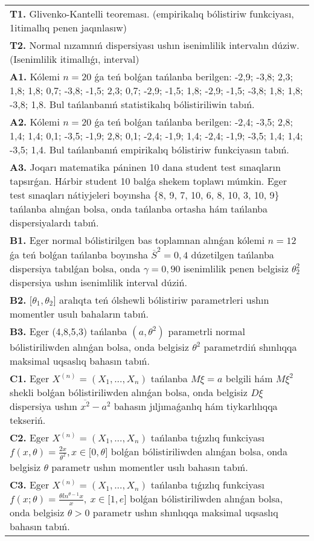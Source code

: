 \documentclass{article}
\begin{document}
\begin{tabular}{m{17cm}}
\textbf{T1.} 
Glivenko-Kantelli teoreması. (empirikalıq bólistiriw funkciyası, 1itimallıq penen jaqınlasıw)
 \\
\textbf{T2.} 
Normal nızamnıń dispersiyası ushın isenimlilik intervalın dúziw. (Isenimlilik itimallıǵı, interval)
 \\
\textbf{A1.} 
Kólemi \(n = 20\) ǵa teń bolǵan tańlanba berilgen: -2,9; -3,8; 2,3; 1,8; 1,8; 0,7; -3,8; -1,5; 2,3; 0,7; -2,9; -1,5; 1,8; -2,9; -1,5; -3,8; 1,8; 1,8; -3,8; 1,8. Bul tańlanbanıń statistikalıq bólistiriliwin tabıń.
 \\
\textbf{A2.} 
Kólemi \(n = 20\) ǵa teń bolǵan tańlanba berilgen: -2,4; -3,5; 2,8; 1,4; 1,4; 0,1; -3,5; -1,9; 2,8; 0,1; -2,4; -1,9; 1,4; -2,4; -1,9; -3,5; 1,4; 1,4; -3,5; 1,4. Bul tańlanbanıń empirikalıq bólistiriw funkciyasın tabıń.
 \\
\textbf{A3.} 
Joqarı matematika páninen 10 dana student test sınaqların tapsırǵan. Hárbir student 10 balǵa shekem toplawı múmkin. Eger test sınaqları nátiyjeleri boyınsha \{8, 9, 7, 10, 6, 8, 10, 3, 10, 9\} tańlanba alınǵan bolsa, onda tańlanba ortasha hám tańlanba dispersiyalardı tabıń.
 \\
\textbf{B1.} 
Eger normal bólistirilgen bas toplamnan alınǵan kólemi \(n = 12\) ǵa teń bolǵan tańlanba boyınsha \({\overline{S}}^{2} = 0,4\) dúzetilgen tańlanba dispersiya tabılǵan bolsa, onda \(\gamma = 0,90\) isenimlilik penen belgisiz \(\theta_{2}^{2}\) dispersiya ushın isenimlilik interval dúziń.
 \\
\textbf{B2.} 
\(\lbrack\theta_{1},\theta_{2}\rbrack\) aralıqta teń ólshewli bólistiriw parametrleri ushın momentler usulı bahaların tabıń.
 \\
\textbf{B3.} 
Eger (4,8,5,3) tańlanba \(\left( a,\theta^{2} \right)\) parametrli normal bólistiriliwden alınǵan bolsa, onda belgisiz \(\theta^{2}\) parametrdiń shınlıqqa maksimal uqsaslıq bahasın tabıń.
 \\
\textbf{C1.} 
Eger \(X^{(n)} = \left( X_{1},...,X_{n} \right)\) tańlanba \(M\xi = a\) belgili hám \(M\xi^{2}\) shekli bolǵan bólistiriliwden alınǵan bolsa, onda belgisiz \(D\xi\) dispersiya ushın \(\overline{x^{2}} - a^{2}\) bahasın jıljımaǵanlıq hám tiykarlılıqqa tekseriń.
 \\
\textbf{C2.} 
Eger \(X^{(n)} = \left( X_{1},...,X_{n} \right)\) tańlanba tıǵızlıq funkciyası
$f(x,\theta) = \frac{2x}{\theta^{2}},x \in \lbrack 0,\theta\rbrack$
bolǵan bólistiriliwden alınǵan bolsa, onda belgisiz \(\theta\) parametr ushın momentler usılı bahasın tabıń.
 \\
\textbf{C3.} 
Eger \(X^{(n)} = \left( X_{1},...,X_{n} \right)\) tańlanba tıǵızlıq funkciyası
$f(x;\theta) = \frac{\theta ln^{\theta - 1}x}{x},\ x \in \lbrack 1,e\rbrack$
bolǵan bólistiriliwden alınǵan bolsa, onda belgisiz \(\theta > 0\) parametr ushın shınlıqqa maksimal uqsaslıq bahasın tabıń.
 \\

\end{tabular}
\vspace{1cm}
\end{document}
